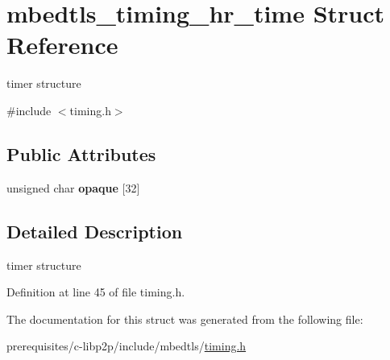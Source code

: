 \hypertarget{structmbedtls__timing__hr__time}{}\section{mbedtls\+\_\+timing\+\_\+hr\+\_\+time Struct Reference}
\label{structmbedtls__timing__hr__time}


timer structure  




{\ttfamily \#include $<$timing.\+h$>$}

\subsection*{Public Attributes}
\begin{DoxyCompactItemize}
\item 
\mbox{\label{structmbedtls__timing__hr__time_a5ad2da97c4ec844c558bb9a49d62ba2f}} 
unsigned char {\bfseries opaque} \mbox{[}32\mbox{]}
\end{DoxyCompactItemize}


\subsection{Detailed Description}
timer structure 

Definition at line 45 of file timing.\+h.



The documentation for this struct was generated from the following file\+:\begin{DoxyCompactItemize}
\item 
prerequisites/c-\/libp2p/include/mbedtls/\mbox{\hyperlink{timing_8h}{timing.\+h}}\end{DoxyCompactItemize}
